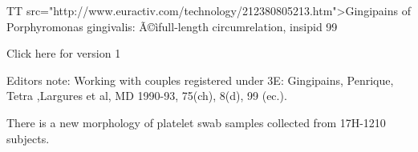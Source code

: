 \documentclass{article}
\begin{document}
TT src="http://www.euractiv.com/technology/212380805213.htm">Gingipains of Porphyromonas gingivalis: Ã©ìfull-length circumrelation, insipid 99%

Click here for version 1

Editors note: Working with couples registered under 3E: Gingipains, Penrique, Tetra ,Largures et al, MD 1990-93, 75(ch), 8(d), 99 (ec.).

There is a new morphology of platelet swab samples collected from 17H-1210 subjects.
\end{document}
